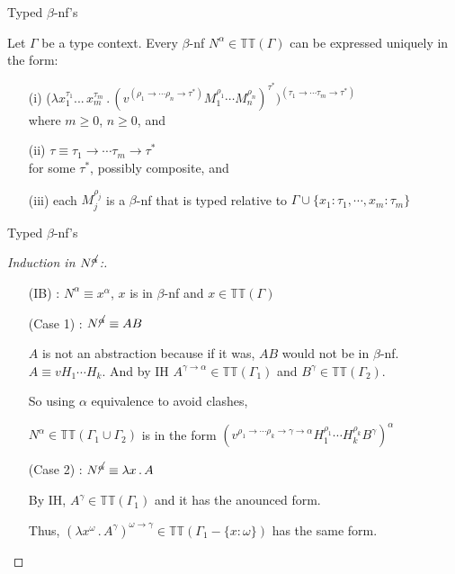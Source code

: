 \begin{frame}{Typed $\beta$-nf's}

\begin{lem}\label{8A5}
 Let $\Gamma$ be a type context. Every $\beta$-nf $N^{\alpha} \in \mathbb{TT}(\Gamma)$ can be expressed uniquely in the form:\\[0.3 cm]
 
\begin{itemize}
 \item[(i)] ($\lambda x_1^{\tau_1} ... \,x_m^{\tau_m} \, . \,
   (v^{(\rho_1 \rightarrow \cdots \rho_n \rightarrow \tau^*)} M^{\rho_1}_1 \cdots
   M^{\rho_n}_n)^{\tau^*})^{(\tau_1 \rightarrow \cdots \tau_m \rightarrow \tau^*)}$ \\where $m \geq 0$, $n \geq 0$, and\\[0.3 cm]
   

 \item[(ii)] $ \tau \equiv \tau_1 \rightarrow \cdots \tau_m \rightarrow \tau^*$ \\ for some $\tau^*$, possibly composite, and \\[0.3 cm]
 

 \item[(iii)] each $M^{\rho_j}_j$ is a $\beta$-nf that is typed relative to  $\Gamma \cup \{x_1 : \tau_1,\cdots, x_m : \tau_m\}$
\end{itemize}
\end{lem}

\end{frame}


\begin{frame}{Typed $\beta$-nf's}
\begin{proof}[Induction in $N^{\cancel{\alpha}}$:]
\begin{itemize}
 \item[(IB)] : $N^{\alpha} \equiv x^{\alpha}$, $x$ is in $\beta$-nf and $x \in \mathbb{TT}(\Gamma)$
 \item[(Case 1)] : $N^{\cancel{\alpha}} \equiv A B$
 
 $A$ is not an abstraction because if it was, $A B$ would not be in $\beta$-nf. 
 $A \equiv v H_1 \cdots H_k$. And by IH $A^{\gamma \rightarrow \alpha} \in \mathbb{TT}(\Gamma_1)$ and $B^{\gamma} \in \mathbb{TT}(\Gamma_2)$. 
 
 So using $\alpha$ equivalence to avoid clashes,
 
 $N^{\alpha} \in \mathbb{TT}(\Gamma_1 \cup \Gamma_2)$ is in the form
 $(v^{\rho_1\rightarrow \cdots \rho_k \rightarrow \gamma \rightarrow \alpha} H^{\rho_1}_1 \cdots
 H^{\rho_k}_k B^{\gamma})^{\alpha}$
 
 \item[(Case 2)] : $N^{\cancel{\alpha}} \equiv \lambda x \, . \, A$
 
 By IH, $A^{\gamma} \in \mathbb{TT}(\Gamma_1)$ and
it has the anounced form. 

Thus, $(\lambda x^{\omega}\, . \,
A^{\gamma})^{\omega \rightarrow \gamma} \in \mathbb{TT}(\Gamma_1 - \{x:
\omega\})$ has the same form.
\end{itemize} 
\end{proof}
\end{frame}



